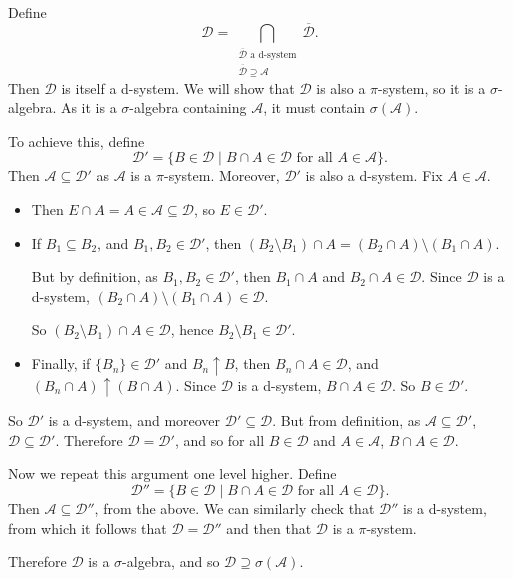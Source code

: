 \documentclass[12pt]{article}
\begin{document}
\begin{proofbox}
	Define
	\[
		\mathcal{D} = \bigcap_{\substack{\overline{\mathcal{D}} \text{ a d-system} \\ \overline{\mathcal{D}} \supseteq \mathcal{A}}} \overline{\mathcal{D}}.
	\]
	Then $\mathcal{D}$ is itself a d-system. We will show that $\mathcal{D}$ is also a $\pi$-system, so it is a $\sigma$-algebra. As it is a $\sigma$-algebra containing $\mathcal{A}$, it must contain $\sigma(\mathcal{A})$.

	To achieve this, define
	\[
		\mathcal{D}' = \{B \in \mathcal{D} \mid B \cap A \in \mathcal{D} \text{ for all } A \in \mathcal{A}\}.
	\]
	Then $\mathcal{A} \subseteq \mathcal{D}'$ as $\mathcal{A}$ is a $\pi$-system. Moreover, $\mathcal{D}'$ is also a d-system. Fix $A \in \mathcal{A}$.
	\begin{itemize}
		\item Then $E \cap A = A \in \mathcal{A} \subseteq \mathcal{D}$, so $E \in \mathcal{D}'$.
		\item If $B_1 \subseteq B_2$, and $B_1, B_2 \in \mathcal{D}'$, then $(B_2 \setminus B_1) \cap A = (B_2 \cap A) \setminus (B_1 \cap A)$.

			But by definition, as $B_1, B_2 \in \mathcal{D}'$, then $B_1 \cap A$ and $B_2 \cap A \in \mathcal{D}$. Since $\mathcal{D}$ is a d-system, $(B_2 \cap A) \setminus (B_1 \cap A) \in \mathcal{D}$.

			So $(B_2 \setminus B_1) \cap A \in \mathcal{D}$, hence $B_2 \setminus B_1 \in \mathcal{D}'$.
		\item Finally, if $\{B_n\} \in \mathcal{D}'$ and $B_n \uparrow B$, then $B_n \cap A \in \mathcal{D}$, and $(B_n \cap A) \uparrow (B \cap A)$. Since $\mathcal{D}$ is a d-system, $B \cap A \in \mathcal{D}$. So $B \in \mathcal{D}'$.
	\end{itemize}
	So $\mathcal{D}'$ is a d-system, and moreover $\mathcal{D}' \subseteq \mathcal{D}$. But from definition, as $\mathcal{A} \subseteq \mathcal{D}'$, $\mathcal{D} \subseteq \mathcal{D}'$. Therefore $\mathcal{D} = \mathcal{D}'$, and so for all $B \in \mathcal{D}$ and $A \in \mathcal{A}$, $B \cap A \in \mathcal{D}$.

	Now we repeat this argument one level higher. Define
	\[
		\mathcal{D}'' = \{B \in \mathcal{D} \mid B \cap A \in \mathcal{D} \text{ for all } A \in \mathcal{D}\}.
	\]
	Then $\mathcal{A} \subseteq \mathcal{D}''$, from the above. We can similarly check that $\mathcal{D}''$ is a d-system, from which it follows that $\mathcal{D} = \mathcal{D}''$ and then that $\mathcal{D}$ is a $\pi$-system.

	Therefore $\mathcal{D}$ is a $\sigma$-algebra, and so $\mathcal{D} \supseteq \sigma(\mathcal{A})$.
\end{proofbox}
\end{document}
